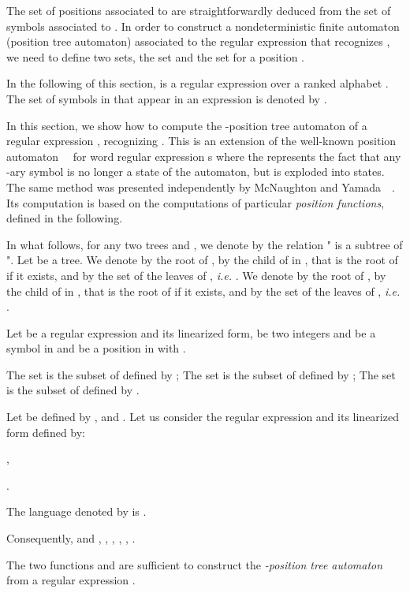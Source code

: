 \documentclass{llncs}
\begin{document}
The set of positions associated to  are straightforwardly deduced from the set of symbols associated to . 
In order to construct a nondeterministic finite automaton (position tree automaton) associated to the 
regular expression   that recognizes ,
we need to define two sets, the set  and the set  for a position .


  In the following of this section,  is a regular expression  over a ranked alphabet . 
  The set of symbols in  that appear in an expression  is denoted by .


  In this section, we show how to compute the -position tree automaton of a regular expression   , recognizing . This is an extension of the well-known position automaton~~\cite{glushkov} for word regular expression  s where the  represents the fact that any -ary symbol is no longer a state of the automaton, but is exploded into  states.
  The same method was presented independently by McNaughton and Yamada~~\cite{mcnaughton60}.  
   Its computation is based on the computations of particular \emph{position functions}, defined in the following.
  
  In what follows, for any two trees  and , we denote by  the relation " is a subtree of ".
  Let  be a tree. 
We denote by  the root of , by  the  child of  in , that is the root of  if it exists, and by  the set of the leaves of , \emph{i.e.} . 
  We denote by  the root of , by  the  child of  in , that is the root of  if it exists, and by  the set of the leaves of , \emph{i.e.} . 
  
  Let  be a regular expression  and  its linearized form,  be two integers and  be a symbol in  and  be a position in  with .

  The set  is the subset of  defined by ; The set  is the subset of  defined by ; The set  is the subset of  defined by .
  
 \begin{example}\label{Pos Automat}
 Let  be defined by ,  and .
    Let us consider the regular expression    and its linearized form defined by:
   
    
\noindent,
   
    
\noindent.
      
The language denoted by  is .

Consequently,  and , , , , ,  . 
\end{example}  
 

The two functions  and  are sufficient to construct the \emph{-position tree automaton} from a regular expression  . 
 
\end{document}
